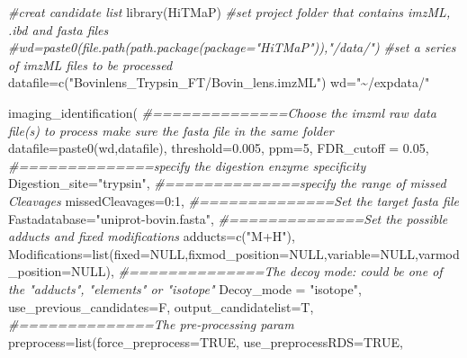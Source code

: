 \documentclass[
]{article}
\newenvironment{Shaded}{\begin{snugshade}}{\end{snugshade}}
\newcommand{\AttributeTok}[1]{\textcolor[rgb]{0.77,0.63,0.00}{#1}}
\newcommand{\CommentTok}[1]{\textcolor[rgb]{0.56,0.35,0.01}{\textit{#1}}}
\newcommand{\ConstantTok}[1]{\textcolor[rgb]{0.00,0.00,0.00}{#1}}
\newcommand{\DecValTok}[1]{\textcolor[rgb]{0.00,0.00,0.81}{#1}}
\newcommand{\FloatTok}[1]{\textcolor[rgb]{0.00,0.00,0.81}{#1}}
\newcommand{\FunctionTok}[1]{\textcolor[rgb]{0.00,0.00,0.00}{#1}}
\newcommand{\NormalTok}[1]{#1}
\newcommand{\OtherTok}[1]{\textcolor[rgb]{0.56,0.35,0.01}{#1}}
\newcommand{\SpecialCharTok}[1]{\textcolor[rgb]{0.00,0.00,0.00}{#1}}
\newcommand{\StringTok}[1]{\textcolor[rgb]{0.31,0.60,0.02}{#1}}
\begin{document}
\begin{Shaded}
\begin{Highlighting}[]
\CommentTok{\#creat candidate list}
\FunctionTok{library}\NormalTok{(HiTMaP)}
\CommentTok{\#set project folder that contains imzML, .ibd and fasta files}
\CommentTok{\#wd=paste0(file.path(path.package(package="HiTMaP")),"/data/")}
\CommentTok{\#set a series of imzML files to be processed}
\NormalTok{datafile}\OtherTok{=}\FunctionTok{c}\NormalTok{(}\StringTok{"Bovinlens\_Trypsin\_FT/Bovin\_lens.imzML"}\NormalTok{)}
\NormalTok{wd}\OtherTok{=}\StringTok{"\textasciitilde{}/expdata/"}


\FunctionTok{imaging\_identification}\NormalTok{(}
\CommentTok{\#==============Choose the imzml raw data file(s) to process  make sure the fasta file in the same folder}
               \AttributeTok{datafile=}\FunctionTok{paste0}\NormalTok{(wd,datafile),}
               \AttributeTok{threshold=}\FloatTok{0.005}\NormalTok{, }
               \AttributeTok{ppm=}\DecValTok{5}\NormalTok{,}
               \AttributeTok{FDR\_cutoff =} \FloatTok{0.05}\NormalTok{,}
\CommentTok{\#==============specify the digestion enzyme specificity}
               \AttributeTok{Digestion\_site=}\StringTok{"trypsin"}\NormalTok{,}
\CommentTok{\#==============specify the range of missed Cleavages}
               \AttributeTok{missedCleavages=}\DecValTok{0}\SpecialCharTok{:}\DecValTok{1}\NormalTok{,}
\CommentTok{\#==============Set the target fasta file}
               \AttributeTok{Fastadatabase=}\StringTok{"uniprot{-}bovin.fasta"}\NormalTok{,}
\CommentTok{\#==============Set the possible adducts and fixed modifications}
               \AttributeTok{adducts=}\FunctionTok{c}\NormalTok{(}\StringTok{"M+H"}\NormalTok{),}
               \AttributeTok{Modifications=}\FunctionTok{list}\NormalTok{(}\AttributeTok{fixed=}\ConstantTok{NULL}\NormalTok{,}\AttributeTok{fixmod\_position=}\ConstantTok{NULL}\NormalTok{,}\AttributeTok{variable=}\ConstantTok{NULL}\NormalTok{,}\AttributeTok{varmod\_position=}\ConstantTok{NULL}\NormalTok{),}
\CommentTok{\#==============The decoy mode: could be one of the "adducts", "elements" or "isotope"}
               \AttributeTok{Decoy\_mode =} \StringTok{"isotope"}\NormalTok{,}
               \AttributeTok{use\_previous\_candidates=}\NormalTok{F,}
               \AttributeTok{output\_candidatelist=}\NormalTok{T,}
\CommentTok{\#==============The pre{-}processing param}
               \AttributeTok{preprocess=}\FunctionTok{list}\NormalTok{(}\AttributeTok{force\_preprocess=}\ConstantTok{TRUE}\NormalTok{,}
                               \AttributeTok{use\_preprocessRDS=}\ConstantTok{TRUE}\NormalTok{,}

\end{Highlighting}
\end{Shaded}
\end{document}
